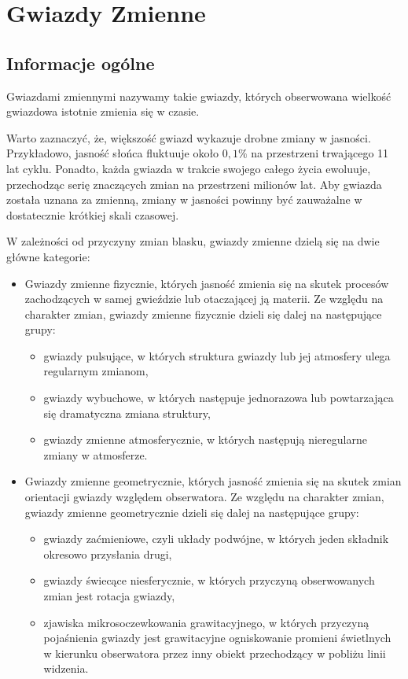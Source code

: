 \documentclass{pracalicmgr}
\begin{document}
	\section{Gwiazdy Zmienne}
    \subsection{Informacje ogólne}
    \begin{defn}
        Gwiazdami zmiennymi nazywamy takie gwiazdy, których obserwowana wielkość gwiazdowa istotnie zmienia się w czasie. 
    \end{defn}
    Warto zaznaczyć, że, większość gwiazd wykazuje drobne zmiany w jasności. Przykładowo, jasność słońca fluktuuje około $0,1\%$ na przestrzeni trwającego 11 lat cyklu. Ponadto, każda gwiazda w trakcie swojego całego życia ewoluuje, przechodząc serię znaczących zmian na przestrzeni milionów lat. Aby gwiazda została uznana za zmienną, zmiany w jasności powinny być zauważalne w dostatecznie krótkiej skali czasowej.
    
    W zależności od przyczyny zmian blasku, gwiazdy zmienne dzielą się na dwie główne kategorie:
    \begin{itemize}
        \item Gwiazdy zmienne fizycznie, których jasność zmienia się na skutek procesów zachodzących w samej gwieździe lub otaczającej ją materii. Ze względu na charakter zmian, gwiazdy zmienne fizycznie dzieli się dalej na następujące grupy:\begin{itemize}
            \item gwiazdy pulsujące, w których struktura gwiazdy lub jej atmosfery ulega regularnym zmianom,
            \item gwiazdy wybuchowe, w których następuje jednorazowa lub powtarzająca się dramatyczna zmiana struktury,
            \item gwiazdy zmienne atmosferycznie, w których następują nieregularne zmiany w atmosferze.
        \end{itemize}
        \item Gwiazdy zmienne geometrycznie, których jasność zmienia się na skutek zmian orientacji gwiazdy względem obserwatora. Ze względu na charakter zmian, gwiazdy zmienne geometrycznie dzieli się dalej na następujące grupy:\begin{itemize}
            \item gwiazdy zaćmieniowe, czyli układy podwójne, w których jeden składnik okresowo przysłania drugi,
            \item gwiazdy świecące niesferycznie, w których przyczyną obserwowanych zmian jest rotacja gwiazdy,
            \item zjawiska mikrosoczewkowania grawitacyjnego, w których przyczyną pojaśnienia gwiazdy jest grawitacyjne ogniskowanie promieni świetlnych w kierunku obserwatora przez inny obiekt przechodzący w pobliżu linii widzenia.
        \end{itemize}
    \end{itemize}
    
\end{document}
